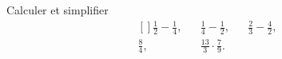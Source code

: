 
\begin{exercice}\label{exoSeconde-0017}

    Calculer et simplifier
    \begin{equation}
        \begin{aligned}[]
            \frac{ 1 }{ 2 }-\frac{1}{ 4 },&&\frac{1}{ 4 }-\frac{ 1 }{2},&&\frac{ 2 }{ 3 }-\frac{ 4 }{ 2 },\\
            \frac{ 8 }{ 4 },&&\frac{ 13 }{ 3 }\cdot \frac{ 7 }{ 9 }.
        \end{aligned}
    \end{equation}

\end{exercice}
